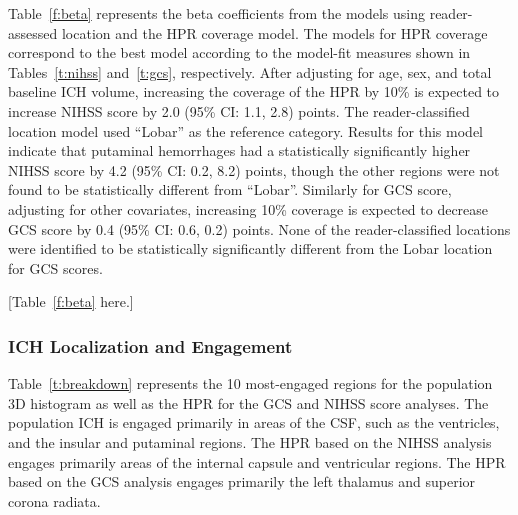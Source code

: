 \documentclass[10pt]{article}\usepackage[]{graphicx}\usepackage[]{color}
\begin{document}
Table~\ref{f:beta} represents the beta coefficients from the models using reader-assessed location and the HPR coverage model.  The models for HPR coverage correspond to the best model according to the model-fit measures shown in Tables~\ref{t:nihss} and~\ref{t:gcs}, respectively. After adjusting for age, sex, and total baseline ICH volume, increasing the coverage of the HPR by 10\% is expected to increase NIHSS score by 2.0 (95\% CI: 1.1, 2.8) points.  The reader-classified location model used ``Lobar'' as the reference category. Results for this model indicate that putaminal hemorrhages had a statistically significantly higher NIHSS score by 4.2 (95\% CI: 0.2, 8.2) points, though the other regions were not found to be statistically different from ``Lobar''. 
Similarly for GCS score, adjusting for other covariates, increasing 10\% coverage is expected to decrease GCS score by 0.4 (95\% CI: 0.6, 0.2) points.  None of the reader-classified locations were identified to be statistically significantly different from the Lobar location for GCS scores.

[Table~\ref{f:beta} here.]








\subsubsection{ICH Localization and Engagement}

Table~\ref{t:breakdown} represents the 10 most-engaged regions for the population 3D histogram as well as the HPR for the GCS and NIHSS score  analyses.  The population ICH is engaged primarily in areas of the CSF, such as the ventricles, and the insular and putaminal regions. The HPR based on the NIHSS analysis engages primarily areas of the internal capsule and ventricular regions. The HPR based on the GCS analysis engages primarily the left thalamus and superior corona radiata.
\end{document}
